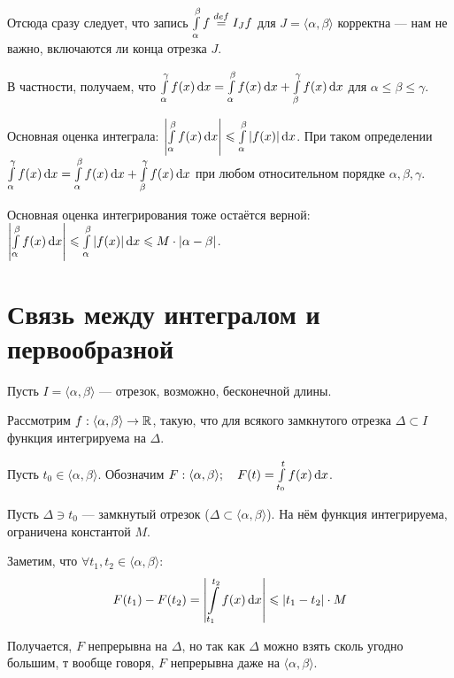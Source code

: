 \documentclass[a4paper]{report}
\begin{document}
    Отсюда сразу следует, что запись $\int\limits_\alpha^\beta f \overset{def}{=} I_J f$ для $J = \langle \alpha, \beta \rangle$ корректна --- нам не важно, включаются ли конца отрезка $J$.

    В частности, получаем, что $\int\limits_\alpha^\gamma f(x) \operatorname{d}\! x = \int\limits_\alpha^\beta f(x) \operatorname{d}\! x + \int\limits_\beta^\gamma f(x) \operatorname{d}\! x$ для $\alpha \le \beta \le \gamma$.

    \ok

    Основная оценка интеграла: $\left|\int\limits_\alpha^\beta f(x) \operatorname{d}\! x\right| \leqslant \int\limits_\alpha^\beta |f(x)| \operatorname{d}\! x$.
    При таком определении $\int\limits_\alpha^\gamma f(x) \operatorname{d}\! x = \int\limits_\alpha^\beta f(x) \operatorname{d}\! x + \int\limits_\beta^\gamma f(x) \operatorname{d}\! x$ при любом относительном порядке $\alpha, \beta, \gamma$.

    Основная оценка интегрирования тоже остаётся верной: $\left|\int\limits_\alpha^\beta f(x) \operatorname{d}\! x\right| \leqslant \int\limits_\alpha^\beta |f(x)| \operatorname{d}\! x \leqslant M \cdot |\alpha - \beta|$.


    \section{Связь между интегралом и первообразной}
    Пусть $I = \langle \alpha, \beta \rangle$ --- отрезок, возможно, бесконечной длины.

    Рассмотрим $f: \langle \alpha, \beta \rangle \rightarrow \mathbb{R}$, такую, что для всякого замкнутого отрезка $\Delta \subset I$ функция интегрируема на $\Delta$.

    Пусть $t_0 \in \langle \alpha, \beta \rangle$.
    Обозначим $F: \langle \alpha, \beta \rangle; \quad F(t) = \int\limits_{t_0}^{t}f(x) \operatorname{d}\! x$.

    Пусть $\Delta \ni t_0$ --- замкнутый отрезок ($\Delta \subset \langle \alpha, \beta \rangle$).
    На нём функция интегрируема, ограничена константой $M$.

    Заметим, что $\forall t_1, t_2 \in \langle \alpha, \beta \rangle$:
    \[F(t_1) - F(t_2) = \left|\int\limits_{t_1}^{t_2}f(x) \operatorname{d}\! x\right| \leqslant |t_1 - t_2| \cdot M\]

    Получается, $F$ непрерывна на $\Delta$, но так как $\Delta$ можно взять сколь угодно большим, т вообще говоря, $F$ непрерывна даже на $\langle \alpha, \beta\rangle$.
\end{document}
